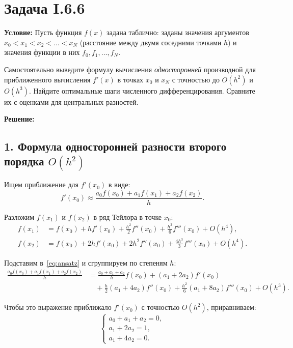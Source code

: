\documentclass{article}
\begin{document}
\section*{Задача I.6.6}

\textbf{Условие:} Пусть функция $f(x)$ задана таблично: заданы значения аргументов $x_0 < x_1 < x_2 < \ldots < x_N$ (расстояние между двумя соседними точками $h$) и значения функции в них $f_0, f_1, \ldots, f_N$.

Самостоятельно выведите формулу вычисления \textit{односторонней} производной для приближенного вычисления $f'(x)$ в точках $x_0$ и $x_N$ с точностью до $O(h^2)$ и $O(h^3)$. Найдите оптимальные шаги численного дифференцирования. Сравните их с оценками для центральных разностей.

\vspace{0.5cm}
\textbf{Решение:}

\subsection*{1. Формула односторонней разности второго порядка $O(h^2)$}

Ищем приближение для $f'(x_0)$ в виде:
\begin{equation}
f'(x_0) \approx \frac{a_0 f(x_0) + a_1 f(x_1) + a_2 f(x_2)}{h}.
\label{eq:ansatz}
\end{equation}

Разложим $f(x_1)$ и $f(x_2)$ в ряд Тейлора в точке $x_0$:
\begin{align}
f(x_1) &= f(x_0) + h f'(x_0) + \frac{h^2}{2} f''(x_0) + \frac{h^3}{6} f'''(x_0) + O(h^4), \\
f(x_2) &= f(x_0) + 2h f'(x_0) + 2h^2 f''(x_0) + \frac{4h^3}{3} f'''(x_0) + O(h^4).
\end{align}

Подставим в~\eqref{eq:ansatz} и сгруппируем по степеням $h$:
\begin{align}
\frac{a_0 f(x_0) + a_1 f(x_1) + a_2 f(x_2)}{h}
&= \frac{a_0 + a_1 + a_2}{h} f(x_0) + (a_1 + 2a_2) f'(x_0) \nonumber \\
&\quad + \frac{h}{2}(a_1 + 4a_2) f''(x_0) + \frac{h^2}{6}(a_1 + 8a_2) f'''(x_0) + O(h^3).
\end{align}

Чтобы это выражение приближало $f'(x_0)$ с точностью $O(h^2)$, приравниваем:
\begin{equation}
\begin{cases}
a_0 + a_1 + a_2 = 0, \\
a_1 + 2a_2 = 1, \\
a_1 + 4a_2 = 0.
\end{cases}
\label{eq:system}
\end{equation}
\end{document}
